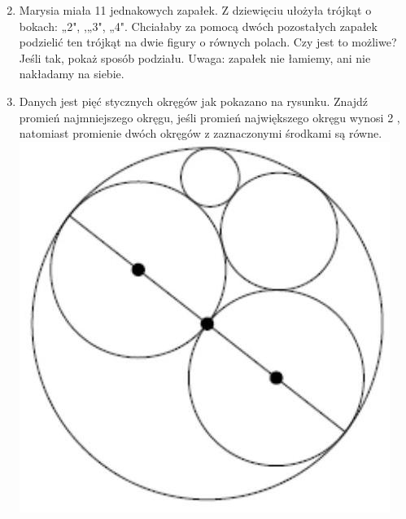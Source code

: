 \documentclass[10pt]{article}
\begin{document}
\begin{enumerate}
  \setcounter{enumi}{1}
  \item Marysia miała 11 jednakowych zapałek. Z dziewięciu ułożyła trójkąt o bokach: „2", ,„3", „4". Chciałaby za pomocą dwóch pozostałych zapałek podzielić ten trójkąt na dwie figury o równych polach. Czy jest to możliwe? Jeśli tak, pokaż sposób podziału. Uwaga: zapałek nie łamiemy, ani nie nakładamy na siebie.
  \item Danych jest pięć stycznych okręgów jak pokazano na rysunku. Znajdź promień najmniejszego okręgu, jeśli promień największego okręgu wynosi 2 , natomiast promienie dwóch okręgów z zaznaczonymi środkami są równe.\\
\includegraphics[max width=\textwidth, center]{2024_11_21_453869ede2e906b091c4g-1}
\end{enumerate}
\end{document}
